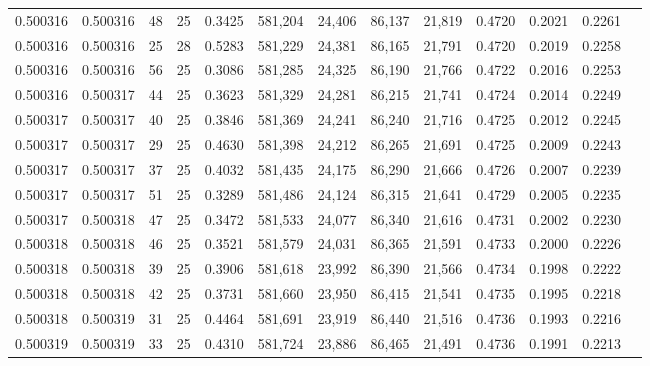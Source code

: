 \begin{tabular}{rrrrrrrrrrrrr}
0.500316 & 0.500316 &    48 &  25 &                                     0.3425 & 581,204 &  24,406 &  86,137 &  21,819 & 0.4720 & 0.2021 & 0.2261 \\
0.500316 & 0.500316 &    25 &  28 &                                     0.5283 & 581,229 &  24,381 &  86,165 &  21,791 & 0.4720 & 0.2019 & 0.2258 \\
0.500316 & 0.500316 &    56 &  25 &                                     0.3086 & 581,285 &  24,325 &  86,190 &  21,766 & 0.4722 & 0.2016 & 0.2253 \\
0.500316 & 0.500317 &    44 &  25 &                                     0.3623 & 581,329 &  24,281 &  86,215 &  21,741 & 0.4724 & 0.2014 & 0.2249 \\
0.500317 & 0.500317 &    40 &  25 &                                     0.3846 & 581,369 &  24,241 &  86,240 &  21,716 & 0.4725 & 0.2012 & 0.2245 \\
0.500317 & 0.500317 &    29 &  25 &                                     0.4630 & 581,398 &  24,212 &  86,265 &  21,691 & 0.4725 & 0.2009 & 0.2243 \\
0.500317 & 0.500317 &    37 &  25 &                                     0.4032 & 581,435 &  24,175 &  86,290 &  21,666 & 0.4726 & 0.2007 & 0.2239 \\
0.500317 & 0.500317 &    51 &  25 &                                     0.3289 & 581,486 &  24,124 &  86,315 &  21,641 & 0.4729 & 0.2005 & 0.2235 \\
0.500317 & 0.500318 &    47 &  25 &                                     0.3472 & 581,533 &  24,077 &  86,340 &  21,616 & 0.4731 & 0.2002 & 0.2230 \\
0.500318 & 0.500318 &    46 &  25 &                                     0.3521 & 581,579 &  24,031 &  86,365 &  21,591 & 0.4733 & 0.2000 & 0.2226 \\
0.500318 & 0.500318 &    39 &  25 &                                     0.3906 & 581,618 &  23,992 &  86,390 &  21,566 & 0.4734 & 0.1998 & 0.2222 \\
0.500318 & 0.500318 &    42 &  25 &                                     0.3731 & 581,660 &  23,950 &  86,415 &  21,541 & 0.4735 & 0.1995 & 0.2218 \\
0.500318 & 0.500319 &    31 &  25 &                                     0.4464 & 581,691 &  23,919 &  86,440 &  21,516 & 0.4736 & 0.1993 & 0.2216 \\
0.500319 & 0.500319 &    33 &  25 &                                     0.4310 & 581,724 &  23,886 &  86,465 &  21,491 & 0.4736 & 0.1991 & 0.2213 \\

\end{tabular}
